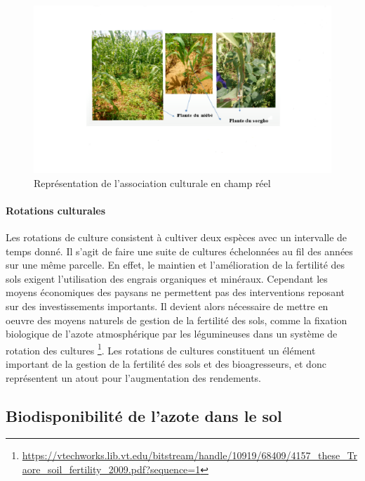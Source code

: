 \documentclass[a4paper,11pt]{article}
\begin{document}
\begin{figure}%
  \begin{center}
   \includegraphics[width=16cm]{images/AssociationChampReel}
\end{center}
\caption{ Représentation de l'association culturale en champ réel}
\end{figure}

\paragraph{Rotations culturales}

Les rotations de culture consistent à cultiver deux espèces avec un
intervalle de temps donné. Il s'agit de faire une suite de cultures
échelonnées au fil des années sur une même parcelle. En effet, le
maintien et l’amélioration de la fertilité des sols exigent
l’utilisation des engrais organiques et minéraux. Cependant les moyens
économiques des paysans ne permettent pas des interventions reposant
sur des investissements importants. Il devient alors nécessaire de
mettre en oeuvre des moyens naturels de gestion de la fertilité des
sols, comme la fixation biologique de l’azote atmosphérique par les
légumineuses dans un système de rotation des cultures
\footnote{\url{https://vtechworks.lib.vt.edu/bitstream/handle/10919/68409/4157_these_Traore_soil_fertility_2009.pdf?sequence=1}}. Les rotations de cultures constituent un élément
important de la gestion de la fertilité des sols et des bioagresseurs,
et donc représentent un atout pour l’augmentation des rendements.



\subsection{Biodisponibilité de l’azote dans le sol}
\end{document}
